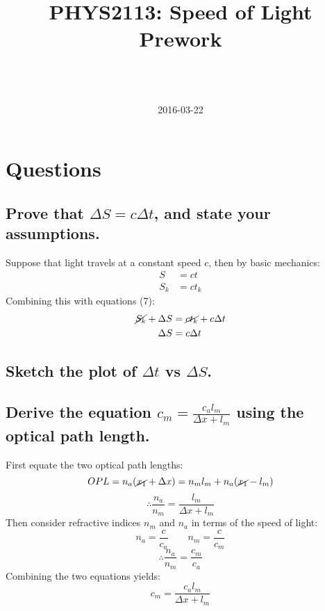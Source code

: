 \documentclass[a4paper]{scrartcl}
\begin{document}
\title{PHYS2113: Speed of Light Prework}
\author{ \\ \\ }
\date{2016-03-22}
\maketitle

\section{Questions}
\subsection{Prove that \(\Delta S = c \Delta t\), and state your assumptions.}
Suppose that light travels at a constant speed \(c\), then by basic mechanics:
\begin{align*}
    S &= c t \\
    S_k &= c t_k
\end{align*}
%
Combining this with equations (7):
\begin{align*}
    \cancel{S_k} + \Delta S &= \cancel{c t_k} + c \Delta t \\
    \Delta S &= c \Delta t
\end{align*}

\subsection{Sketch the plot of \(\Delta t\) vs \(\Delta S\).}
\begin{center}
\end{center}

\subsection{Derive the equation \(c_m = \frac{c_a l_m}{\Delta x + l_m}\) using the optical path length.}
First equate the two optical path lengths:
\[OPL = n_a (\cancel{x_1} + \Delta x) = n_m l_m + n_a (\cancel{x_1} - l_m)\]
\[\therefore \frac{n_a}{n_m} = \frac{l_m}{\Delta x + l_m}\]
%
Then consider refractive indices \(n_m\) and \(n_a\) in terms of the speed of light:
\[n_a = \frac{c}{c_a} \qquad n_m = \frac{c}{c_m}\]
\[\therefore \frac{n_a}{n_m} = \frac{c_m}{c_a}\]
%
Combining the two equations yields:
\[c_m = \frac{c_a l_m}{\Delta x + l_m}\]
\end{document}
